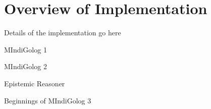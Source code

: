 \chapter{Overview of Implementation}\label{ch:implementation}

Details of the implementation go here

MIndiGolog 1

MIndiGolog 2

Epistemic Reasoner

Beginnings of MIndiGolog 3


